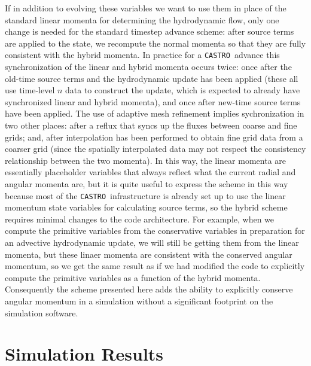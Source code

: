 \documentclass[twocolumn,numberedappendix]{../aastex6}
\newcommand{\castro}{\texttt{CASTRO}}
\begin{document}
If in addition to evolving these variables we want to use them in place of the
standard linear momenta for determining the hydrodynamic flow, only one change
is needed for the standard timestep advance scheme: after source terms are
applied to the state, we recompute the normal momenta so that they are fully
consistent with the hybrid momenta. In practice for a \castro\ advance this
synchronization of the linear and hybrid momenta occurs twice: once after the
old-time source terms and the hydrodynamic update has been applied (these all
use time-level $n$ data to construct the update, which is expected to already have
synchronized linear and hybrid momenta), and once after new-time source
terms have been applied. The use of adaptive mesh refinement implies sychronization
in two other places: after a reflux that syncs up the fluxes between coarse and
fine grids; and, after interpolation has been performed to obtain fine grid data
from a coarser grid (since the spatially interpolated data may not respect the
consistency relationship between the two momenta). In this way, the linear momenta
are essentially placeholder variables that always reflect what the current radial
and angular momenta are, but it is quite useful to express the scheme in this way
because most of the \castro\ infrastructure is already set up to use the linear
momentum state variables for calculating source terms, so the hybrid scheme requires
minimal changes to the code architecture. For example, when we compute
the primitive variables from the conservative variables in preparation for an advective
hydrodynamic update, we will still be getting them from the linear momenta,
but these linaer momenta are consistent with the conserved angular momentum,
so we get the same result as if we had modified the code to explicitly compute
the primitive variables as a function of the hybrid momenta. Consequently the
scheme presented here adds the ability to explicitly conserve angular momentum
in a simulation without a significant footprint on the simulation software.



\section{Simulation Results}\label{sec:results}



\end{document}
